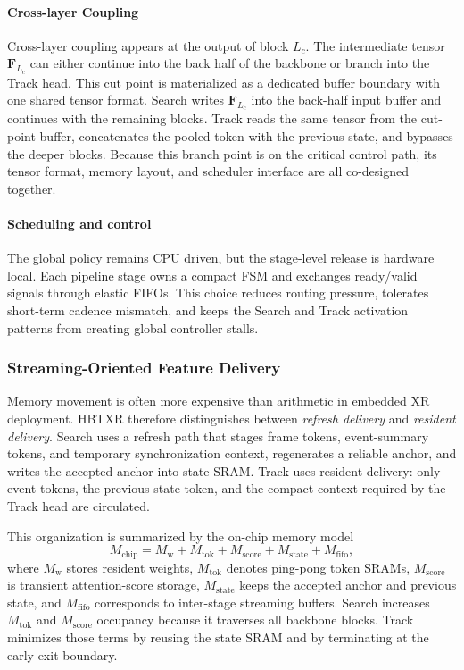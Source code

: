 \documentclass[journal]{IEEEtran}
\begin{document}
\paragraph*{Cross-layer Coupling}
Cross-layer coupling appears at the output of block $L_c$. The intermediate tensor $\mathbf F_{L_c}$ can either continue into the back half of the backbone or branch into the Track head. This cut point is materialized as a dedicated buffer boundary with one shared tensor format. Search writes $\mathbf F_{L_c}$ into the back-half input buffer and continues with the remaining blocks. Track reads the same tensor from the cut-point buffer, concatenates the pooled token with the previous state, and bypasses the deeper blocks. Because this branch point is on the critical control path, its tensor format, memory layout, and scheduler interface are all co-designed together.

\paragraph*{Scheduling and control}
The global policy remains CPU driven, but the stage-level release is hardware local. Each pipeline stage owns a compact FSM and exchanges ready/valid signals through elastic FIFOs. This choice reduces routing pressure, tolerates short-term cadence mismatch, and keeps the Search and Track activation patterns from creating global controller stalls.

\subsubsection{Streaming-Oriented Feature Delivery}
Memory movement is often more expensive than arithmetic in embedded XR deployment. HBTXR therefore distinguishes between \emph{refresh delivery} and \emph{resident delivery}. Search uses a refresh path that stages frame tokens, event-summary tokens, and temporary synchronization context, regenerates a reliable anchor, and writes the accepted anchor into state SRAM. Track uses resident delivery: only event tokens, the previous state token, and the compact context required by the Track head are circulated.

This organization is summarized by the on-chip memory model
\begin{equation}
M_{\mathrm{chip}} = M_{\mathrm{w}} + M_{\mathrm{tok}} + M_{\mathrm{score}}
+ M_{\mathrm{state}} + M_{\mathrm{fifo}},
\end{equation}
where $M_{\mathrm{w}}$ stores resident weights, $M_{\mathrm{tok}}$ denotes ping-pong token SRAMs, $M_{\mathrm{score}}$ is transient attention-score storage, $M_{\mathrm{state}}$ keeps the accepted anchor and previous state, and $M_{\mathrm{fifo}}$ corresponds to inter-stage streaming buffers. Search increases $M_{\mathrm{tok}}$ and $M_{\mathrm{score}}$ occupancy because it traverses all backbone blocks. Track minimizes those terms by reusing the state SRAM and by terminating at the early-exit boundary.
\end{document}
